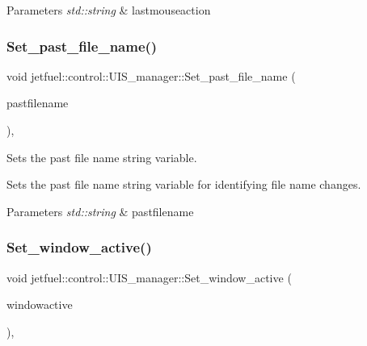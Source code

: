\begin{DoxyParams}{Parameters}
{\em std\+::string} & lastmouseaction \\
\hline
\end{DoxyParams}
\mbox{\label{classjetfuel_1_1control_1_1UIS__manager_a5fff180a335246d905531a00bc34fbe8}} 
\subsubsection{\texorpdfstring{Set\+\_\+past\+\_\+file\+\_\+name()}{Set\_past\_file\_name()}}
{\footnotesize\ttfamily void jetfuel\+::control\+::\+U\+I\+S\+\_\+manager\+::\+Set\+\_\+past\+\_\+file\+\_\+name (\begin{DoxyParamCaption}\item[{const std\+::string}]{pastfilename }\end{DoxyParamCaption})\hspace{0.3cm}{\ttfamily [inline]}, {\ttfamily [protected]}}



Sets the past file name string variable. 

Sets the past file name string variable for identifying file name changes.


\begin{DoxyParams}{Parameters}
{\em std\+::string} & pastfilename \\
\hline
\end{DoxyParams}
\mbox{\label{classjetfuel_1_1control_1_1UIS__manager_aadc46749d1ea102cf957bcc6da98654e}} 
\subsubsection{\texorpdfstring{Set\+\_\+window\+\_\+active()}{Set\_window\_active()}}
{\footnotesize\ttfamily void jetfuel\+::control\+::\+U\+I\+S\+\_\+manager\+::\+Set\+\_\+window\+\_\+active (\begin{DoxyParamCaption}\item[{const bool}]{windowactive }\end{DoxyParamCaption})\hspace{0.3cm}{\ttfamily [inline]}, {\ttfamily [protected]}}



